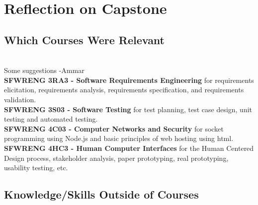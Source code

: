 \documentclass{article}
\begin{document}

\section{Reflection on Capstone}


\subsection{Which Courses Were Relevant}

\\
Some suggestions -Ammar\\
\textbf{SFWRENG 3RA3 - Software Requirements Engineering} for requirements elicitation, requirements analysis, requirements specification, and requirements validation.\\
\textbf{SFWRENG 3S03 - Software Testing} for test planning, test case design, unit testing and automated testing.\\
\textbf{SFWRENG 4C03 - Computer Networks and Security} for socket programming using Node.js and basic principles of web hosting using html.\\
\textbf{SFWRENG 4HC3 - Human Computer Interfaces} for the Human Centered Design process, stakeholder analysis, paper prototyping, real prototyping, usability testing, etc.\\


\subsection{Knowledge/Skills Outside of Courses}

\end{document}
